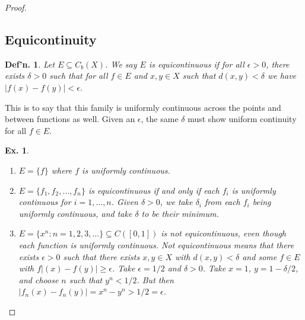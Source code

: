 \documentclass[12pt, a4paper]{book}
\newtheorem{definition}[theorem]{Def'n.}
\newtheorem{example}[theorem]{Ex.}
\theoremstyle{nonumberplain}
\newtheorem{proof}{Proof}
\begin{document}
\begin{proof}
\subsection{Equicontinuity}
\begin{definition}
    Let $E\subseteq C_b(X)$.
    We say $E$ is equicontinuous if for all $\epsilon>0$, there exists $\delta>0$ such that for all $f\in E$
    and $x,y\in X$ such that $d(x,y)<\delta$ we have $|f(x)-f(y)|<\epsilon$.
\end{definition}
This is to say that this family is uniformly continuous across the points and between functions as well.
Given an $\epsilon$, the same $\delta$ must show uniform continuity for all $f\in E$.
\begin{example}
    \begin{enumerate}
        \item $E=\{f\}$ where $f$ is uniformly continuous.
        \item $E=\{f_1,f_2,\ldots,f_n\}$ is equicontinuous if and only if each $f_i$ is uniformly continuous for $i=1,\ldots,n$.
            Given $\delta>0$, we take $\delta_i$ from each $f_i$ being uniformly continuous, and take $\delta$ to be their minimum.
        \item $E=\{x^n:n=1,2,3,\ldots\}\subseteq C([0,1])$ is not equicontinuous, even though each function is uniformly continuous.
            Not equicontinuous means that there exists $\epsilon>0$ such that there exists $x,y\in X$ with $d(x,y)<\delta$
            and some $f\in E$ with $f|(x)-f(y)|\geq\epsilon$. Take $\epsilon=1/2$ and $\delta>0$. Take $x=1$, $y=1-\delta/2$,
            and choose $n$ such that $y^n<1/2$. But then $|f_n(x)-f_n(y)|=x^n-y^n>1/2=\epsilon$.
    \end{enumerate}
\end{example}


\end{proof}
\end{document}
